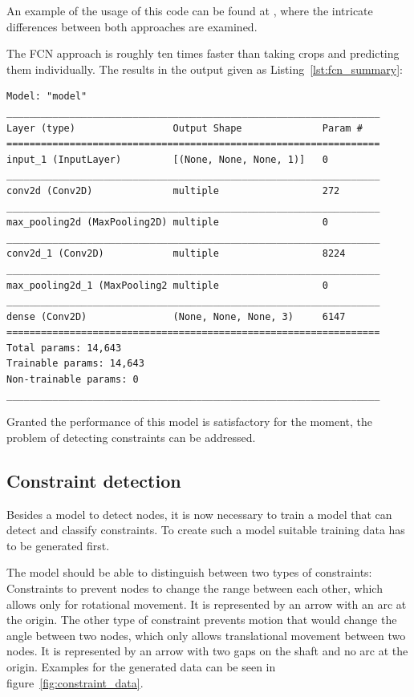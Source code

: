 An example of the usage of this code can be found at , where the intricate differences between both approaches are examined.

The FCN approach is roughly ten times faster than taking crops and predicting them individually. 
The  results in the output given as Listing~\ref{lst:fcn_summary}:

\begin{lstlisting}[label={lst:fcn_summary}, caption={Summary of Symbol Classifier transformed into a FCN.}]
Model: "model"
_________________________________________________________________
Layer (type)                 Output Shape              Param #   
=================================================================
input_1 (InputLayer)         [(None, None, None, 1)]   0         
_________________________________________________________________
conv2d (Conv2D)              multiple                  272       
_________________________________________________________________
max_pooling2d (MaxPooling2D) multiple                  0         
_________________________________________________________________
conv2d_1 (Conv2D)            multiple                  8224      
_________________________________________________________________
max_pooling2d_1 (MaxPooling2 multiple                  0         
_________________________________________________________________
dense (Conv2D)               (None, None, None, 3)     6147      
=================================================================
Total params: 14,643
Trainable params: 14,643
Non-trainable params: 0
_________________________________________________________________
\end{lstlisting}

Granted the performance of this model is satisfactory for the moment, the problem of detecting constraints can be addressed.

\subsection{Constraint detection}

Besides a model to detect nodes, it is now necessary to train a model that can detect and classify constraints.
To create such a model suitable training data has to be generated first.

The model should be able to distinguish between two types of constraints:
Constraints to prevent nodes to change the range between each other, which allows only for rotational movement.
It is represented by an arrow with an arc at the origin.
The other type of constraint prevents motion that would change the angle between two nodes, which only allows translational movement between two nodes.
It is represented by an arrow with two gaps on the shaft and no arc at the origin.
Examples for the generated data can be seen in figure~\ref{fig:constraint_data}.

